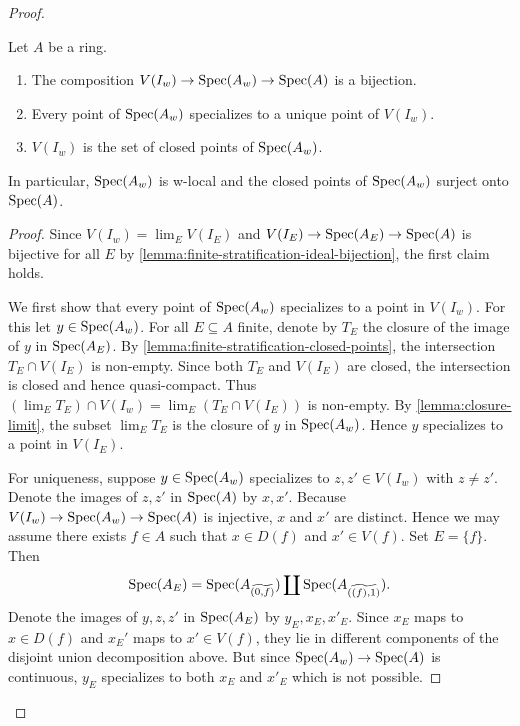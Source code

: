 \begin{proof}
\begin{lemma}
    Let $A$ be a ring.
    \begin{enumerate}
        \item The composition $V(I_w) \to \mathrm{Spec}(A_w) \to \mathrm{Spec}(A)$ is a bijection.
            \label{item:w-localization-bijection}
        \item Every point of $\mathrm{Spec}(A_w)$ specializes to a unique point of $V(I_w)$.
        \item $V(I_w)$ is the set of closed points of $\mathrm{Spec}(A_w)$.
    \end{enumerate}
    In particular, $\mathrm{Spec}(A_w)$ is w-local and the closed points of $\mathrm{Spec}(A_w)$ surject onto $\mathrm{Spec}(A)$.
    \label{lemma:w-localization-closed-points}
\end{lemma}

\begin{proof}
    Since $V(I_w) = \lim_{E} V(I_E)$ and $V(I_E) \to \mathrm{Spec}(A_E) \to \mathrm{Spec}(A)$ is
    bijective for all $E$ by \ref{lemma:finite-stratification-ideal-bijection}, the
    first claim holds.

    We first show that every point of $\mathrm{Spec}(A_w)$ specializes to a point in $V(I_w)$.
    For this let $y \in \mathrm{Spec}(A_w)$. For all $E \subseteq A$ finite, denote by
    $T_E$ the closure of the image of $y$ in $\mathrm{Spec}(A_E)$. By
    \ref{lemma:finite-stratification-closed-points}, the intersection $T_E \cap V(I_E)$ is
    non-empty. Since both $T_E$ and $V(I_E)$ are closed, the intersection is closed
    and hence quasi-compact. Thus $(\lim_E T_E) \cap V(I_w) = \lim_E (T_E \cap V(I_E))$ is non-empty.
    By \ref{lemma:closure-limit}, the subset $\lim_E T_E$ is the closure of $y$ in $\mathrm{Spec}(A_w)$. Hence
    $y$ specializes to a point in $V(I_E)$.

    For uniqueness, suppose $y \in \mathrm{Spec}(A_w)$ specializes to $z, z' \in V(I_w)$ with
    $z \neq z'$. Denote the images of $z, z'$ in $\mathrm{Spec}(A)$ by $x, x'$.
    Because $V(I_w) \to \mathrm{Spec}(A_w) \to \mathrm{Spec}(A)$ is injective, $x$ and $x'$ are distinct. Hence we may
    assume there exists $f \in A$ such that $x \in D(f)$ and $x' \in V(f)$. Set
    $E = \{f\}$. Then
    \[
        \mathrm{Spec}(A_E) = \mathrm{Spec}(A_{\widetilde{(0, f)}}) \coprod \mathrm{Spec}(A_{\widetilde{((f), 1)}})
    .\]
    Denote the images of $y, z, z'$ in $\mathrm{Spec}(A_E)$ by $y_E, x_E, x'_E$. Since
    $x_E$ maps to $x \in D(f)$ and $x_E'$ maps to $x' \in V(f)$, they lie
    in different components of the disjoint union decomposition above. But
    since $\mathrm{Spec}(A_w) \to \mathrm{Spec}(A)$ is continuous, $y_E$ specializes to both $x_E$ and $x'_E$
    which is not possible.


\end{proof}
\end{proof}
